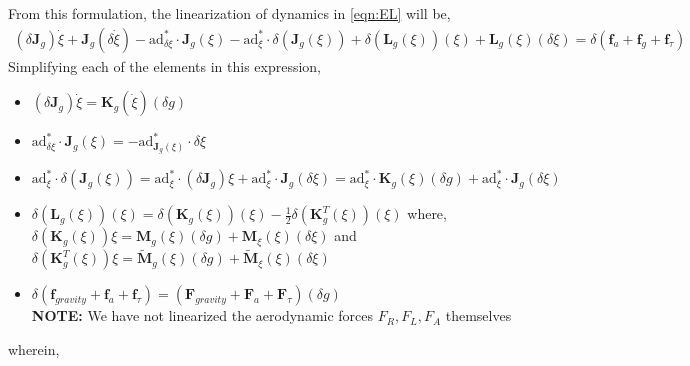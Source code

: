 \documentclass[10pt]{article}
\newcommand{\ad}{\ensuremath{\mathrm{ad}}}
\begin{document}
From this formulation, the linearization of dynamics in \eqref{eqn:EL} will be,
\begin{gather*}
(\delta \mathbf{J}_g) \dot{\xi} + \mathbf{J}_g(\delta \dot{\xi}) - \ad^*_{\delta \xi} \cdot \mathbf{J}_g(\xi) - \ad^*_\xi \cdot \delta (\mathbf{J}_g(\xi)) + \delta (\mathbf{L}_g(\xi)) (\xi) + \mathbf{L}_g(\xi) (\delta \xi) = \delta (\mathbf{f}_a + \mathbf{f}_g + \mathbf{f}_\tau)
\end{gather*}
Simplifying each of the elements in this expression,
\begin{itemize}
	\item $	(\delta \mathbf{J}_g) \dot{\xi} = \mathbf{K}_g (\dot{\xi}) (\delta g) $
	\item $ \ad^*_{\delta \xi} \cdot \mathbf{J}_g(\xi) = - \ad^*_{\mathbf{J}_g(\xi)} \cdot \delta \xi $
	\item $ \ad^*_\xi \cdot \delta (\mathbf{J}_g(\xi)) =  \ad^*_\xi \cdot (\delta \mathbf{J}_g) \xi +  \ad^*_\xi \cdot \mathbf{J}_g (\delta\xi) = \ad^*_\xi \cdot \mathbf{K}_g(\xi)(\delta g) +  \ad^*_\xi \cdot \mathbf{J}_g (\delta\xi) $
	\item $ \delta (\mathbf{L}_g(\xi)) (\xi) = \delta (\mathbf{K}_g(\xi)) (\xi) - \frac{1}{2} \delta (\mathbf{K}_g^T(\xi)) (\xi)$ where, $ \delta (\mathbf{K}_g(\xi)) \xi = \mathbf{M}_g(\xi) (\delta g) + \mathbf{M}_\xi (\xi) (\delta \xi) $ and $ \delta(\mathbf{K}^T_g(\xi)) \xi = \tilde{\mathbf{M}}_g(\xi) (\delta g) + \tilde{\mathbf{M}}_\xi(\xi) (\delta \xi) $
	\item $	\delta (\mathbf{f}_{gravity} + \mathbf{f}_a + \mathbf{f}_\tau) = (\mathbf{F}_{gravity} + \mathbf{F}_a + \mathbf{F}_\tau) (\delta g) $
	\\
	\textbf{NOTE:} We have not linearized the aerodynamic forces $ F_R, F_L, F_A $ themselves
\end{itemize}
%
wherein,
\end{document}
